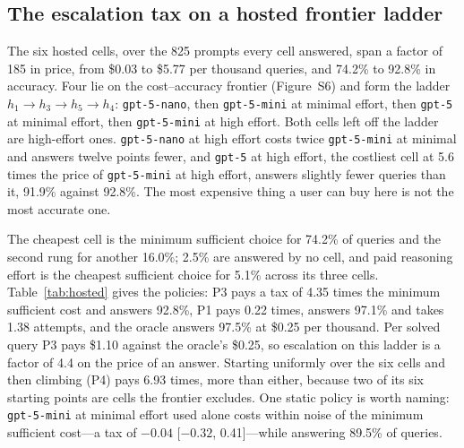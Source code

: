 \subsection{The escalation tax on a hosted frontier ladder}
\label{sec:results-hosted}

\begin{table}[ht]
\centering
\small
\caption{Escalation policies on the hosted ladder under oracle detection, in
US dollars per 1{,}000 queries. The static rows are the ladder rungs used
alone. As on the public pool, a policy that answers fewer queries can show a
negative tax by underpaying through failure, so the tax is read beside the
solved column.}
\label{tab:hosted}

\end{table}

The six hosted cells, over the 825 prompts every cell answered, span a factor
of 185 in price, from \$0.03 to \$5.77 per thousand queries, and 74.2\% to
92.8\% in accuracy. Four lie on the cost--accuracy frontier (Figure~S6) and form the ladder
$h_1 \rightarrow h_3 \rightarrow h_5 \rightarrow h_4$: \texttt{gpt-5-nano},
then \texttt{gpt-5-mini} at minimal effort, then \texttt{gpt-5} at minimal
effort, then \texttt{gpt-5-mini} at high effort. Both cells left off the
ladder are high-effort ones. \texttt{gpt-5-nano} at high effort costs twice
\texttt{gpt-5-mini} at minimal and answers twelve points fewer, and
\texttt{gpt-5} at high effort, the costliest cell at 5.6 times the price of
\texttt{gpt-5-mini} at high effort, answers slightly fewer queries than it,
91.9\% against 92.8\%. The most expensive thing a user can buy here is not
the most accurate one.

The cheapest cell is the minimum sufficient choice for 74.2\% of queries and
the second rung for another 16.0\%; 2.5\% are answered by no cell, and paid
reasoning effort is the cheapest sufficient choice for 5.1\% across its three
cells. Table~\ref{tab:hosted} gives the policies: P3 pays a tax of 4.35 times
the minimum sufficient cost and answers 92.8\%, P1 pays 0.22 times, answers
97.1\% and takes 1.38 attempts, and the oracle answers 97.5\% at \$0.25 per
thousand. Per solved query P3 pays \$1.10 against the oracle's \$0.25, so
escalation on this ladder is a factor of 4.4 on the price of an answer.
Starting uniformly over the six cells and then climbing (P4) pays 6.93 times,
more than either, because two of its six starting points are cells the
frontier excludes. One static policy is worth naming: \texttt{gpt-5-mini} at
minimal effort used alone costs within noise of the minimum sufficient
cost---a tax of $-0.04$ [$-0.32$, 0.41]---while answering 89.5\% of queries.

